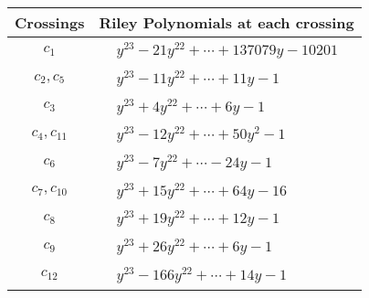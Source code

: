 \documentclass[1p]{elsarticle_modified}
\theoremstyle{definition}
\begin{document}
\begin{tabular}{m{50pt}|m{274pt}}
Crossings & \hspace{64pt}Riley Polynomials at each crossing \\
\hline $$\begin{aligned}c_{1}\end{aligned}$$&$\begin{aligned}
&y^{23}-21 y^{22}+\cdots+137079 y-10201
\end{aligned}$\\
\hline $$\begin{aligned}c_{2},c_{5}\end{aligned}$$&$\begin{aligned}
&y^{23}-11 y^{22}+\cdots+11 y-1
\end{aligned}$\\
\hline $$\begin{aligned}c_{3}\end{aligned}$$&$\begin{aligned}
&y^{23}+4 y^{22}+\cdots+6 y-1
\end{aligned}$\\
\hline $$\begin{aligned}c_{4},c_{11}\end{aligned}$$&$\begin{aligned}
&y^{23}-12 y^{22}+\cdots+50 y^2-1
\end{aligned}$\\
\hline $$\begin{aligned}c_{6}\end{aligned}$$&$\begin{aligned}
&y^{23}-7 y^{22}+\cdots-24 y-1
\end{aligned}$\\
\hline $$\begin{aligned}c_{7},c_{10}\end{aligned}$$&$\begin{aligned}
&y^{23}+15 y^{22}+\cdots+64 y-16
\end{aligned}$\\
\hline $$\begin{aligned}c_{8}\end{aligned}$$&$\begin{aligned}
&y^{23}+19 y^{22}+\cdots+12 y-1
\end{aligned}$\\
\hline $$\begin{aligned}c_{9}\end{aligned}$$&$\begin{aligned}
&y^{23}+26 y^{22}+\cdots+6 y-1
\end{aligned}$\\
\hline $$\begin{aligned}c_{12}\end{aligned}$$&$\begin{aligned}
&y^{23}-166 y^{22}+\cdots+14 y-1
\end{aligned}$\\
\hline
\end{tabular}\\~\\
\end{document}
